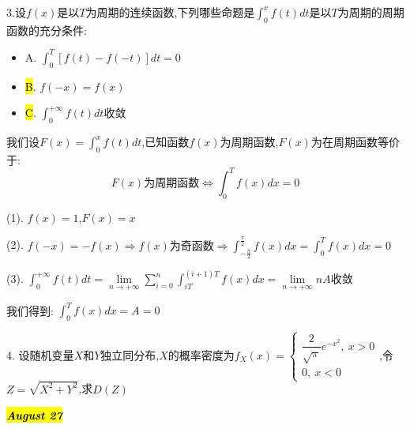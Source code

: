 3.设$f(x)$是以$T$为周期的连续函数,下列哪些命题是$\int_{0}^{x}f(t)dt$是以$T$为周期的周期函数的充分条件:  
\begin{itemize}
	\item A. $\int_{0}^{T}\left[ f(t)-f(-t)\right]dt=0$
	\item \hl{B}. $f(-x)=f(x)$
	\item \hl{C}. $\int_{0}^{+\infty}f(t)dt$收敛
\end{itemize}
\begin{solution}

	我们设$F(x)=\int_{0}^{x}f(t)dt$,已知函数$f(x)$为周期函数,$F(x)$为在周期函数等价于:  
	$$F(x)\text{为周期函数}\Leftrightarrow \int_{0}^{T}f(x)dx=0$$
	
	(1). $f(x)=1$,$F(x)=x$
	
	(2). $f(-x)=-f(x)\Rightarrow f(x)\text{为奇函数}\Rightarrow \int_{-\frac{\pi}{2}}^{\frac{\pi}{2}}f(x)dx=\int_{0}^{T}f(x)dx=0$
	
	(3). $\int_{0}^{+\infty}f(t)dt=\lim\limits_{n\rightarrow+\infty}\sum\limits_{i=0}^{n}\int_{iT}^{(i+1)T}f(x)dx=\lim\limits_{n\rightarrow+\infty}nA\text{收敛}$
	
	我们得到:  $\int_{0}^{T}f(x)dx=A=0$
\end{solution}

4. 设随机变量$X$和$Y$独立同分布,$X$的概率密度为$f_{X}(x)=\left\lbrace
\begin{array}{l}
	\dfrac{2}{\sqrt{\pi}}e^{-x^2},\ x>0\\
	0,\ x<0
\end{array}
\right. $,令$Z=\sqrt{X^2+Y^2}$,求$D(Z)$
\begin{solution}
	
\end{solution}

\hl{\textbf{\textit{August 27}}}


